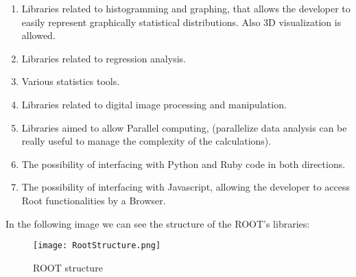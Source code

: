\begin{enumerate}

\item Libraries related to histogramming and graphing, that allows the developer to easily represent graphically statistical distributions. Also 3D visualization is allowed.

\item Libraries related to regression analysis.

\item Various statistics tools. 

\item Libraries related to digital image processing and manipulation.

\item Libraries aimed to allow Parallel computing, (parallelize data analysis can be really useful to manage the complexity of the calculations).

\item The possibility of interfacing with Python and Ruby code in both directions.

\item The possibility of interfacing with Javascript, allowing the developer to access Root functionalities by a Browser.

\end{enumerate}

In the following image we can see the structure of the ROOT's libraries:

\begin{figure}[H]
\centering
\texttt{[image: RootStructure.png]} 
\caption{ROOT structure}
\end{figure}


